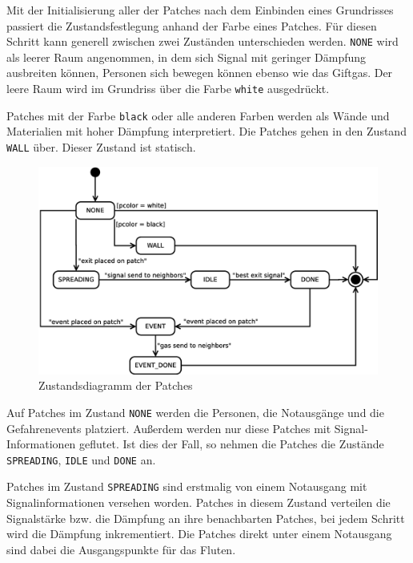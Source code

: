 


Mit der Initialisierung aller der Patches nach dem Einbinden eines Grundrisses passiert die Zustandsfestlegung anhand der Farbe eines Patches. Für diesen Schritt kann generell zwischen zwei Zuständen unterschieden werden. \verb|NONE| wird als leerer Raum angenommen, in dem sich Signal mit geringer Dämpfung ausbreiten können, Personen sich bewegen können ebenso wie das Giftgas. Der leere Raum wird im Grundriss über die Farbe \verb|white| ausgedrückt.

Patches mit der Farbe \verb|black| oder alle anderen Farben werden als Wände und Materialien mit hoher Dämpfung interpretiert. Die Patches gehen in den Zustand \verb|WALL| über. Dieser Zustand ist statisch.

\begin{figure}[!ht]
\centering
\includegraphics[height=0.6\textwidth]{simulationsumgebung/patch.eps}
\caption{Zustandsdiagramm der Patches}
\label{fig:patch}
\end{figure}

Auf Patches im Zustand \verb|NONE| werden die Personen, die Notausgänge und die Gefahrenevents platziert. Außerdem werden nur diese Patches mit Signal-Informationen geflutet. Ist dies der Fall, so nehmen die Patches die Zustände \verb|SPREADING|, \verb|IDLE| und \verb|DONE| an.

Patches im Zustand \verb|SPREADING| sind erstmalig von einem Notausgang mit Signalinformationen versehen worden. Patches in diesem Zustand verteilen die Signalstärke bzw. die Dämpfung an ihre benachbarten Patches, bei jedem Schritt wird die Dämpfung inkrementiert. Die Patches direkt unter einem Notausgang sind dabei die Ausgangspunkte für das Fluten.

